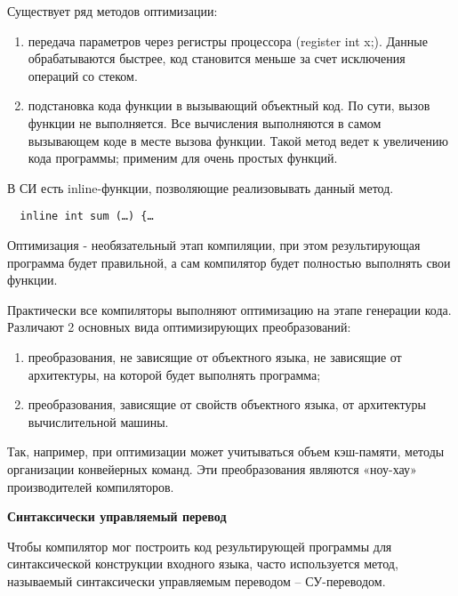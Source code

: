 Существует ряд методов оптимизации:

\begin{enumerate}
  \item передача параметров через регистры процессора (register int x;). Данные обрабатываются быстрее, код становится меньше за счет исключения операций со стеком.
  \item подстановка кода функции в вызывающий объектный код. По сути, вызов функции не выполняется. Все вычисления выполняются в самом вызывающем коде в месте вызова функции. Такой метод ведет к увеличению кода программы; применим для очень простых функций.
\end{enumerate}

В СИ есть inline-функции, позволяющие реализовывать данный метод.

\begin{verbatim}
  inline int sum (…) {…
\end{verbatim}

Оптимизация - необязательный этап компиляции, при этом результирующая программа будет правильной, а сам компилятор будет полностью выполнять свои функции.

Практически все компиляторы выполняют оптимизацию на этапе генерации кода. Различают 2 основных вида оптимизирующих преобразований:

\begin{enumerate}
  \item преобразования, не зависящие от объектного языка, не зависящие от архитектуры, на которой будет выполнять программа;
  \item преобразования, зависящие от свойств объектного языка, от архитектуры вычислительной машины.
\end{enumerate}

Так, например, при оптимизации может учитываться объем кэш-памяти, методы организации конвейерных команд. Эти преобразования являются «ноу-хау» производителей компиляторов.

\begin{center}{\bfseries Синтаксически управляемый перевод}
\end{center}

Чтобы компилятор мог построить код результирующей программы для синтаксической конструкции входного языка, часто используется метод, называемый синтаксически управляемым переводом – СУ-переводом.

